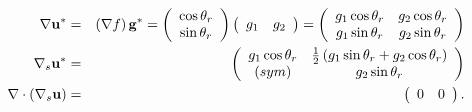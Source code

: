 \documentclass[11pt]{report}
\begin{document}
\begin{eqnarray}
\nabla{\bf u}^* &=& \left( \nabla f \right) {\bf g}^* 
 = \left( \begin{array}{c} \cos{\theta_r} \\ \sin{\theta_r} \end{array}    \right)  
\left(\begin{array}{cc} g_1 & g_2  \end{array} \right)
= \left(\begin{array}{cc} g_1\cos{\theta_r} & g_2\cos{\theta_r} \\ g_1\sin{\theta_r} & g_2\sin{\theta_r}  \end{array} \right)\\
\nabla_s{\bf u}^* &=& \left(\begin{array}{cc} g_1\cos{\theta_r} & \frac{1}{2}\left( g_1\sin{\theta_r} + g_2\cos{\theta_r} \right)\\
                      (sym) & g_2\sin{\theta_r}  \end{array} \right)\\
\nabla\cdot\left(\nabla_s{\bf u}\right) &=&  \left( \begin{array}{cc} 0 & 0 \end{array}   \right).
\end{eqnarray}
\end{document}
